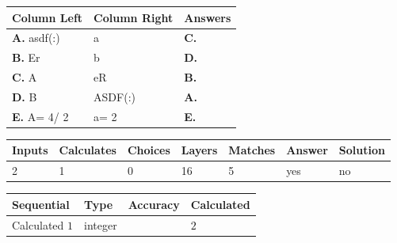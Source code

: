\documentclass[12pt]{article}
\begin{document}
 
\noindent{}
  
  
\begin{tabular}{|l|l|l|}
 \hline
 Column Left & Column Right  & Answers       \\ 
 \hline
{\textbf{\large{
A.}}}
asdf(:)
  & 
a
 & 
{\textbf{\large{
C.}}}
 \\ 
 \hline
{\textbf{\large{
B.}}}
Er
  & 
b
 & 
{\textbf{\large{
D.}}}
 \\ 
 \hline
{\textbf{\large{
C.}}}
A
  & 
eR
 & 
{\textbf{\large{
B.}}}
 \\ 
 \hline
{\textbf{\large{
D.}}}
B
  & 
ASDF(:)
 & 
{\textbf{\large{
A.}}}
 \\ 
 \hline
{\textbf{\large{
E.}}}
 A= %
4/ %
2

  & 
 a= %
2
 & 
{\textbf{\large{
E.}}}
 \\ 
 \hline
 \end{tabular}
  
  
 
 
\noindent{}
 
 
 
   
   
   
   
\noindent\begin{tabular}{|l|l|l|l|l|l|l|}
 \hline
Inputs & Calculates & Choices & Layers & Matches & Answer & Solution \\ \hline
           2  & 
           1  & 
           0
  & 
          16  & 
           5  & 
  yes & 
  no 
  \\ \hline
 \end{tabular}
   
   
   
   
\noindent{}
   
   
  
  
\noindent\begin{tabular}{|l|l|l|l|}
\hline
 Sequential & Type & Accuracy & Calculated \\ 
\hline
 
 
  Calculated $            1 $ & integer &  & 
  $ 2 $ 
 \\  \hline  
 \end{tabular}
   
   
   
\end{document}
